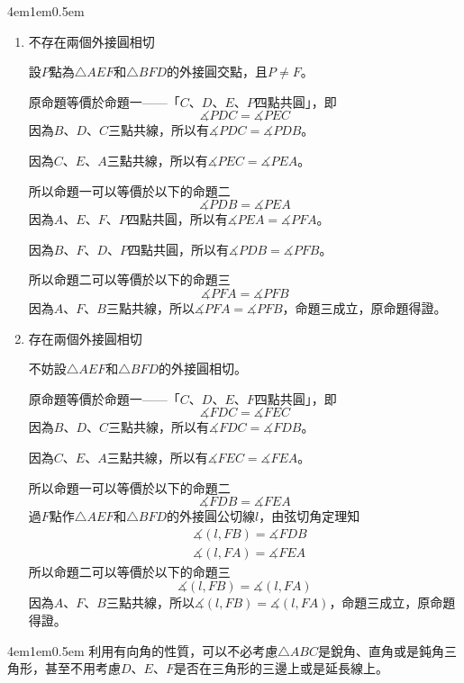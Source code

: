 \documentclass[12pt]{article}
\begin{document}
\begin{mybox}[證明]{4em}{1em}{0.5em}
    \begin{enumerate}[label=情況\arabic*.]
        \item 不存在兩個外接圓相切
        
        設$P$點為$\triangle{AEF}$和$\triangle{BFD}$的外接圓交點，且$P\neq F$。

        原命題等價於命題一——「$C$、$D$、$E$、$P$四點共圓」，即
        $$
            \measuredangle{PDC}=\measuredangle{PEC}
        $$
        因為$B$、$D$、$C$三點共線，所以有$\measuredangle{PDC}=\measuredangle{PDB}$。

        因為$C$、$E$、$A$三點共線，所以有$\measuredangle{PEC}=\measuredangle{PEA}$。

        所以命題一可以等價於以下的命題二
        $$
            \measuredangle{PDB}=\measuredangle{PEA}
        $$
        因為$A$、$E$、$F$、$P$四點共圓，所以有$\measuredangle{PEA}=\measuredangle{PFA}$。

        因為$B$、$F$、$D$、$P$四點共圓，所以有$\measuredangle{PDB}=\measuredangle{PFB}$。

        所以命題二可以等價於以下的命題三
        $$
            \measuredangle{PFA}=\measuredangle{PFB}
        $$
        因為$A$、$F$、$B$三點共線，所以$\measuredangle{PFA}=\measuredangle{PFB}$，命題三成立，原命題得證。

        \item 存在兩個外接圓相切
        
        不妨設$\triangle{AEF}$和$\triangle{BFD}$的外接圓相切。

        原命題等價於命題一——「$C$、$D$、$E$、$F$四點共圓」，即
        $$
            \measuredangle{FDC}=\measuredangle{FEC}
        $$
        因為$B$、$D$、$C$三點共線，所以有$\measuredangle{FDC}=\measuredangle{FDB}$。

        因為$C$、$E$、$A$三點共線，所以有$\measuredangle{FEC}=\measuredangle{FEA}$。

        所以命題一可以等價於以下的命題二
        $$
            \measuredangle{FDB}=\measuredangle{FEA}
        $$
        過$F$點作$\triangle{AEF}$和$\triangle{BFD}$的外接圓公切線$l$，由弦切角定理知
        \begin{align*}
            &\measuredangle{\left(l,FB\right)}=\measuredangle{FDB}\\
            &\measuredangle{\left(l,FA\right)}=\measuredangle{FEA}
        \end{align*}
        所以命題二可以等價於以下的命題三
        $$
            \measuredangle{\left(l,FB\right)}=\measuredangle{\left(l,FA\right)}
        $$
        因為$A$、$F$、$B$三點共線，所以$\measuredangle{\left(l,FB\right)}=\measuredangle{\left(l,FA\right)}$，命題三成立，原命題得證。
    \end{enumerate}  
\end{mybox}
\begin{mybox}[意義]{4em}{1em}{0.5em}
    利用有向角的性質，可以不必考慮$\triangle{ABC}$是銳角、直角或是鈍角三角形，甚至不用考慮$D$、$E$、$F$是否在三角形的三邊上或是延長線上。
\end{mybox}
\newpage
\end{document}
